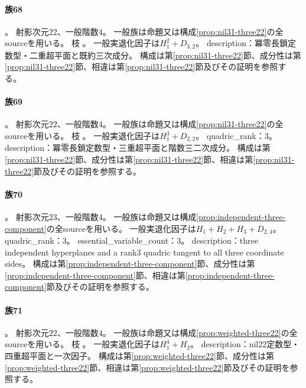 \paragraph{族68}\label{catalogue:R4_NIL31_LONG_DOUBLE_H_CUBIC_22}
。
射影次元$22$、一般階数$4$。
一般族は命題又は構成\ref{prop:nil31-three22}の全sourceを用いる。
枝 。
一般実退化因子は$H_{1}^{2}+D_{3,2}$。
description：冪零長鎖定数型・二重超平面と既約三次成分。
構成は第\ref{prop:nil31-three22}節、成分性は第\ref{prop:nil31-three22}節、相違は第\ref{prop:nil31-three22}節及びその証明を参照する。

\paragraph{族69}\label{catalogue:R4_NIL31_LONG_TRIPLE_H_RANK3_QUADRIC_22}
。
射影次元$22$、一般階数$4$。
一般族は命題又は構成\ref{prop:nil31-three22}の全sourceを用いる。
枝 。
一般実退化因子は$H_{1}^{3}+D_{2,2}$。
quadric\_rank：3。
description：冪零長鎖定数型・三重超平面と階数三二次成分。
構成は第\ref{prop:nil31-three22}節、成分性は第\ref{prop:nil31-three22}節、相違は第\ref{prop:nil31-three22}節及びその証明を参照する。

\paragraph{族70}\label{catalogue:R4_INDEPENDENT_THREE_HYPERPLANES_TRITANGENT_QUADRIC_23}
。
射影次元$23$、一般階数$4$。
一般族は命題又は構成\ref{prop:independent-three-component}の全sourceを用いる。
一般実退化因子は$H_{1}+H_{2}+H_{3}+D_{2,4}$。
quadric\_rank：3。
essential\_variable\_count：3。
description：three independent hyperplanes and a rank3 quadric tangent to all three coordinate sides。
構成は第\ref{prop:independent-three-component}節、成分性は第\ref{prop:independent-three-component}節、相違は第\ref{prop:independent-three-component}節及びその証明を参照する。

\paragraph{族71}\label{catalogue:R4_NIL22_QUADRUPLE_H_LINEAR_22}
。
射影次元$22$、一般階数$4$。
一般族は命題又は構成\ref{prop:weighted-three22}の全sourceを用いる。
枝 。
一般実退化因子は$H_{1}^{4}+H_{2}$。
description：nil22定数型・四重超平面と一次因子。
構成は第\ref{prop:weighted-three22}節、成分性は第\ref{prop:weighted-three22}節、相違は第\ref{prop:weighted-three22}節及びその証明を参照する。

